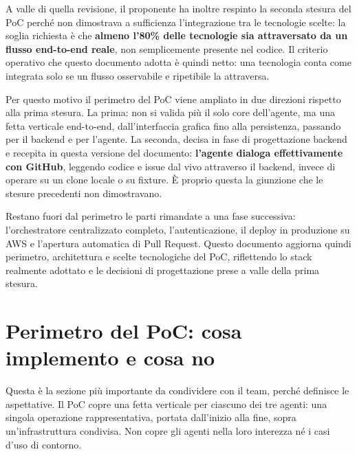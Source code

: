 \documentclass[11pt,a4paper]{article}
\begin{document}
A valle di quella revisione, il proponente ha inoltre respinto la seconda stesura del PoC perché non dimostrava a sufficienza l'integrazione tra le tecnologie scelte: la soglia richiesta è che \textbf{almeno l'80\% delle tecnologie sia attraversato da un flusso end-to-end reale}, non semplicemente presente nel codice. Il criterio operativo che questo documento adotta è quindi netto: una tecnologia conta come integrata solo se un flusso osservabile e ripetibile la attraversa.

Per questo motivo il perimetro del PoC viene ampliato in due direzioni rispetto alla prima stesura. La prima: non si valida più il solo core dell'agente, ma una fetta verticale end-to-end, dall'interfaccia grafica fino alla persistenza, passando per il backend e per l'agente. La seconda, decisa in fase di progettazione backend e recepita in questa versione del documento: \textbf{l'agente dialoga effettivamente con GitHub}, leggendo codice e issue dal vivo attraverso il backend, invece di operare su un clone locale o su fixture. È proprio questa la giunzione che le stesure precedenti non dimostravano.

Restano fuori dal perimetro le parti rimandate a una fase successiva: l'orchestratore centralizzato completo, l'autenticazione, il deploy in produzione su AWS e l'apertura automatica di Pull Request. Questo documento aggiorna quindi perimetro, architettura e scelte tecnologiche del PoC, riflettendo lo stack realmente adottato e le decisioni di progettazione prese a valle della prima stesura.

\section{Perimetro del PoC: cosa implemento e cosa no}
\label{sec:perimetro}

Questa è la sezione più importante da condividere con il team, perché definisce le aspettative. Il PoC copre una fetta verticale per ciascuno dei tre agenti: una singola operazione rappresentativa, portata dall'inizio alla fine, sopra un'infrastruttura condivisa. Non copre gli agenti nella loro interezza né i casi d'uso di contorno.
\end{document}
